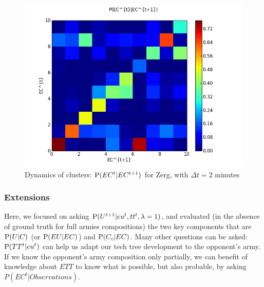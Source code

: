 \begin{figure}[h]
\centerline{\includegraphics[width=0.76\columnwidth]{images/Z_EC_knowing_ECnext.png}}
\caption{Dynamics of clusters: $\mathrm{P}(EC^t|EC^{t+1})$ for Zerg, with $\Delta t = 2$ minutes}
\label{ecknowingecnext}
\end{figure}



\subsubsection{Extensions}

Here, we focused on asking $\mathrm{P}(U^{t+1}|eu^t, tt^t, \lambda=1)$, and evaluated (in the absence of ground truth for full armies compositions) the two key components that are $\mathrm{P}(U|C)$ (or $\mathrm{P}(EU|EC)$) and $\mathrm{P}(C_c|EC)$. Many other questions can be asked: $\mathrm{P}(TT^t|eu^t)$ can help us adapt our tech tree development to the opponent's army. If we know the opponent's army composition only partially, we can benefit of knowledge about $ETT$ to know what is possible, but also probable, by asking $P(EC^t|Observations)$.


